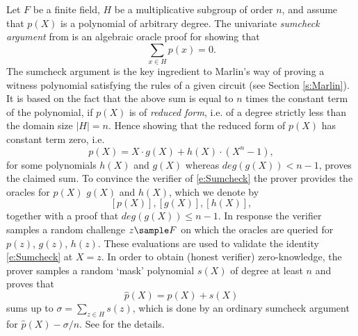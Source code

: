 \documentclass[10pt,article,oneside]{memoir}
\theoremstyle{definition}
\theoremstyle{remark}
\begin{document}
Let $F$ be a finite field, $H$ be a multiplicative subgroup of order $n$, and assume that $p(X)$ is a polynomial of arbitrary degree.
The univariate \textit{sumcheck argument} from \cite{Aurora, Marlin} is an algebraic oracle proof for showing that
\[
\sum_{x\in H} p(x) = 0.
\]
The sumcheck argument is the key ingredient to Marlin's way of proving a witness polynomial satisfying the rules of a given circuit (see Section \ref{s:Marlin}).
It is based on the fact that the above sum is equal to $n$ times the constant term of the polynomial, if $p(X)$ is of \textit{reduced form}, i.e. of a degree strictly less than the domain size $|H|=n$.
Hence showing that the reduced form of $p(X)$ has constant term zero, i.e.
\begin{equation}
\label{e:Sumcheck}
p(X) = X\cdot g(X) + h(X) \cdot (X^n-1),
\end{equation}
for some polynomials $h(X)$ and $g(X)$ whereas $deg(g(X)) < n-1$, proves the claimed sum.
To convince the verifier of \eqref{e:Sumcheck} the prover provides the oracles for $p(X)$ $g(X)$ and $h(X)$, which we denote by 
\[
[p(X)], [g(X)], [h(X)],
\]
together with a proof that $deg(g(X))\leq n-1$.
In response the verifier samples a random challenge $z\sample F$ on which the oracles are queried for $p(z)$, $g(z)$, $h(z)$.
These evaluations are used to validate the identity \eqref{e:Sumcheck} at $X=z$. 
In order to obtain (honest verifier) zero-knowledge, the prover samples a random `mask' polynomial $s(X)$ of degree at least $n$ and proves that
\begin{equation}
\label{e:SumcheckZk}
\hat p(X) = p(X) + s(X)
\end{equation}
sums up to $\sigma = \sum_{z\in H} s(z)$, which  is done by an ordinary sumcheck argument for $\hat p(X) - \sigma/n$.
See \cite{Marlin} for the details.
\end{document}
